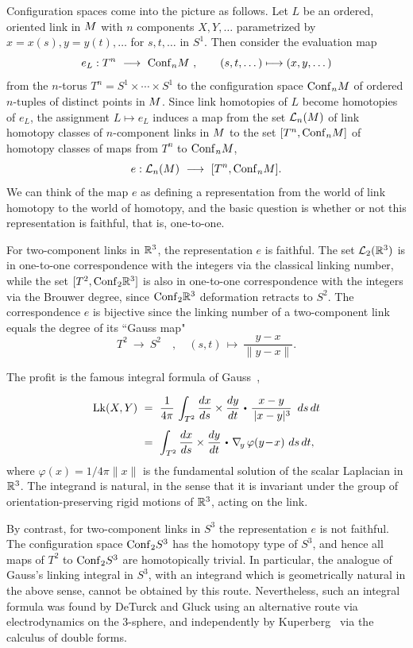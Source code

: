 {Configuration spaces come into the picture as follows.  Let $L$ be an ordered, oriented link in $M$ with $n$ components $X,Y,\dots$ parametrized by $x=x(s),y=y(t), \dots$ for $s,t,\dots$ in $S^1$.  Then consider the {\itb evaluation map} 
$$
e_L : T^n \ \longrightarrow \ \mathrm{Conf}_{n}M\ , \qquad (s, t, \dots)\longmapsto (x, y, \dots)
$$
from the $n$-torus $T^n = S^1\times\cdots\times S^1$ to the configuration space $\mathrm{Conf}_{n}M$ of ordered $n\text{-tuples}$ of distinct points in $M$.  Since link homotopies of $L$ become homotopies of $e_L$, the assignment $L\mapsto e_L$ induces a map from the set $\mathcal L_n(M)$ of link homotopy classes of $n$-component links in $M$ to the set $[T^n,\mathrm{Conf}_{n}M]$ of homotopy classes of maps from $T^n$ to $\mathrm{Conf}_{n}M$,
$$
e : \call_n(\man) \ \longrightarrow \ [T^n,\confn].
$$
We can think of the map $e$ as defining a representation from the world of link homotopy to the world of homotopy, and the basic question  is whether or not this representation is faithful, that is, one-to-one.

For two-component links in $\mathbb R^3$, the representation $e$ is faithful.  The set $\mathcal L_2(\mathbb R^3)$ is in one-to-one correspondence with the integers via the classical linking number, while the set $[T^2,\mathrm{Conf}_{2}\mathbb R^3]$ is also in one-to-one correspondence with the integers via the Brouwer degree, since $\mathrm{Conf}_{2}\mathbb R^3$ deformation retracts to $S^2$.  The correspondence $e$ is bijective since the linking number of a two-component link equals the degree of its ``Gauss map"
$$
T^2 \ \longrightarrow \ S^2\quad , \quad (s,t)\,\longmapsto\, \frac{y-x}{\|y-x\|}.
$$

\break
The profit is the famous integral formula of Gauss~\cite{Gauss},
$$
\begin{aligned}
\lk(X,Y) \ &= \ \frac1{4\pi} \,\int_{T^2} \frac{dx}{ds}  \times \frac{dy}{dt} \dtw  \frac{x-y}{\,|x-y|^3} \ \,ds \, dt \\
\ &= \ \int_{T^2} \frac{dx}{ds}  \times   \frac{dy}{dt}  \dtw  \nabla_{\!y}\,\varphi(y\!-\!x) \ ds \, dt,
\end{aligned}
$$
where $\varphi(x) = 1/4\pi\|x\|$ is the fundamental solution of the scalar Laplacian in $\mathbb R^3$.  The integrand is natural, in the sense that it is invariant under the group of orientation-preserving rigid motions of $\mathbb R^3$, acting on the link.  

By contrast, for two-component links in $S^3$ the representation $e$ is not faithful.  The configuration space $\mathrm{Conf}_{2}S^3$ has the homotopy type of $S^3$, and hence all maps of $T^2$ to $\mathrm{Conf}_{2}S^3$ are homotopically trivial.  In particular, the analogue of Gauss's linking integral in $S^3$, with an integrand which is geometrically natural in the above sense, cannot be obtained by this route.   Nevertheless, such an integral formula was found by DeTurck and Gluck \cite{DeTurckGluck} using an alternative route via electrodynamics on the $3$-sphere, and independently by Kuperberg~\cite{Kuperberg} via the calculus of double forms.

}
